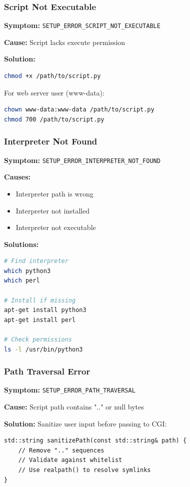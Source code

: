 \documentclass[11pt,a4paper]{article}
\begin{document}
\subsubsection{Script Not Executable}

\textbf{Symptom:} \texttt{SETUP\_ERROR\_SCRIPT\_NOT\_EXECUTABLE}

\textbf{Cause:} Script lacks execute permission

\textbf{Solution:}
\begin{lstlisting}[language=bash]
chmod +x /path/to/script.py
\end{lstlisting}

For web server user (www-data):
\begin{lstlisting}[language=bash]
chown www-data:www-data /path/to/script.py
chmod 700 /path/to/script.py
\end{lstlisting}

\subsubsection{Interpreter Not Found}

\textbf{Symptom:} \texttt{SETUP\_ERROR\_INTERPRETER\_NOT\_FOUND}

\textbf{Causes:}
\begin{itemize}
    \item Interpreter path is wrong
    \item Interpreter not installed
    \item Interpreter not executable
\end{itemize}

\textbf{Solutions:}
\begin{lstlisting}[language=bash]
# Find interpreter
which python3
which perl

# Install if missing
apt-get install python3
apt-get install perl

# Check permissions
ls -l /usr/bin/python3
\end{lstlisting}

\subsubsection{Path Traversal Error}

\textbf{Symptom:} \texttt{SETUP\_ERROR\_PATH\_TRAVERSAL}

\textbf{Cause:} Script path contains ".." or null bytes

\textbf{Solution:} Sanitize user input before passing to CGI:
\begin{lstlisting}
std::string sanitizePath(const std::string& path) {
    // Remove ".." sequences
    // Validate against whitelist
    // Use realpath() to resolve symlinks
}
\end{lstlisting}
\end{document}
